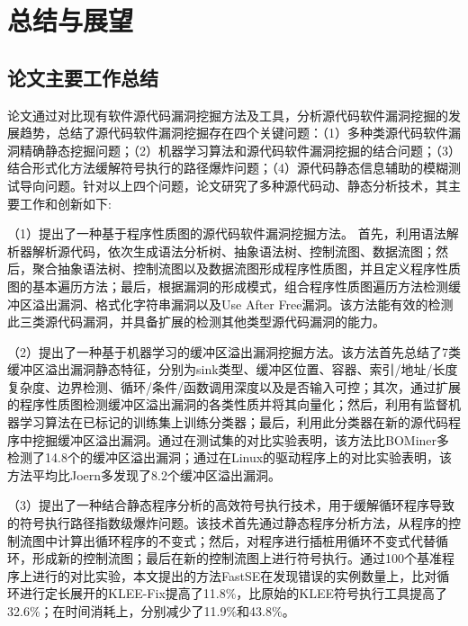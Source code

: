 \chapter{总结与展望}

\section{论文主要工作总结}

论文通过对比现有软件源代码漏洞挖掘方法及工具，分析源代码软件漏洞挖掘的发展趋势，总结了源代码软件漏洞挖掘存在四个关键问题：（1）多种类源代码软件漏洞精确静态挖掘问题；（2）机器学习算法和源代码软件漏洞挖掘的结合问题；（3）结合形式化方法缓解符号执行的路径爆炸问题；（4）源代码静态信息辅助的模糊测试导向问题。针对以上四个问题，论文研究了多种源代码动、静态分析技术，其主要工作和创新如下:

（1）提出了一种基于程序性质图的源代码软件漏洞挖掘方法。
首先，利用语法解析器解析源代码，依次生成语法分析树、抽象语法树、控制流图、数据流图；然后，聚合抽象语法树、控制流图以及数据流图形成程序性质图，并且定义程序性质图的基本遍历方法；最后，根据漏洞的形成模式，组合程序性质图遍历方法检测缓冲区溢出漏洞、格式化字符串漏洞以及Use After Free漏洞。该方法能有效的检测此三类源代码漏洞，并具备扩展的检测其他类型源代码漏洞的能力。

（2）提出了一种基于机器学习的缓冲区溢出漏洞挖掘方法。该方法首先总结了7类缓冲区溢出漏洞静态特征，分别为sink类型、缓冲区位置、容器、索引/地址/长度复杂度、边界检测、循环/条件/函数调用深度以及是否输入可控；其次，通过扩展的程序性质图检测缓冲区溢出漏洞的各类性质并将其向量化；然后，利用有监督机器学习算法在已标记的训练集上训练分类器；最后，利用此分类器在新的源代码程序中挖掘缓冲区溢出漏洞。通过在测试集的对比实验表明，该方法比BOMiner多检测了14.8个的缓冲区溢出漏洞；通过在Linux的驱动程序上的对比实验表明，该方法平均比Joern多发现了8.2个缓冲区溢出漏洞。

（3）提出了一种结合静态程序分析的高效符号执行技术，用于缓解循环程序导致的符号执行路径指数级爆炸问题。该技术首先通过静态程序分析方法，从程序的控制流图中计算出循环程序的不变式；然后，对程序进行插桩用循环不变式代替循环，形成新的控制流图；最后在新的控制流图上进行符号执行。通过100个基准程序上进行的对比实验，本文提出的方法FastSE在发现错误的实例数量上，比对循环进行定长展开的KLEE-Fix提高了11.8\%，比原始的KLEE符号执行工具提高了32.6\%；在时间消耗上，分别减少了11.9\%和43.8\%。

